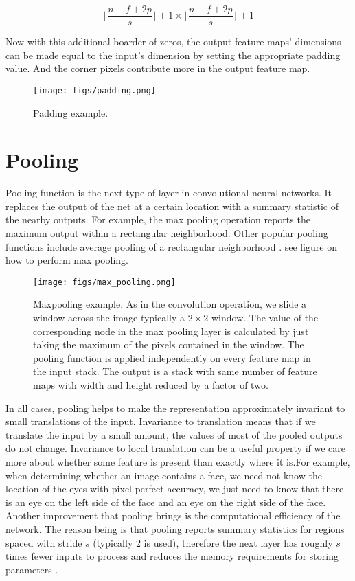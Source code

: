 \begin{equation}
  \label{conv_out_3}
  \lfloor\frac{n - f + 2p}{s}\rfloor + 1 \times \lfloor\frac{n - f + 2p}{s}\rfloor + 1
\end{equation}

Now with this additional boarder of zeros, the output feature maps' dimensions can be made equal to the input's dimension by setting the
appropriate padding value. And the corner pixels contribute more in the output feature map.

\begin{figure}[H]
  \centering
  \texttt{[image: figs/padding.png]}
  \caption{Padding example.}\label{fig:padding}
\end{figure}

\section{Pooling}

Pooling function is the next type of layer in convolutional neural networks. It replaces the output of the net at a certain location with
a summary statistic of the nearby outputs. For example, the max pooling operation reports the maximum output within a rectangular
neighborhood. Other popular pooling functions include average pooling of a rectangular neighborhood \cite{Ian16}.
see figure  on how to perform max pooling.

\begin{figure}[!htbp]
  \centering
  \texttt{[image: figs/max\_pooling.png]}
  \caption{Maxpooling example. As in the convolution operation, we slide a window across the image typically a $2 \times 2$ window. The value of the
  corresponding node in the max pooling layer is calculated by just taking the maximum of the pixels contained in the window. The pooling function
  is applied independently on every feature map in the input stack. The output is a stack with same number of feature maps with width and height
  reduced by a factor of two.}\label{fig:maxpooling}
\end{figure}

In all cases, pooling helps to make the representation approximately invariant to small translations of the input. Invariance to translation means
that if we translate the input by a small amount, the values of most of the pooled outputs do not change. Invariance to local translation can be a
useful property if we care more about whether some feature is present than exactly where it is.For example, when determining whether an image
contains a face, we need not know the location of the eyes with pixel-perfect accuracy, we just need to know that there is an eye on the left side
of the face and an eye on the right side of the face. Another improvement that pooling brings is the computational efficiency of the network. The
reason being is that pooling reports summary statistics for regions spaced with stride $s$ (typically 2 is used), therefore the next layer has
roughly $s$ times fewer inputs to process and reduces the memory requirements for storing parameters \cite{Ian16}. \\

